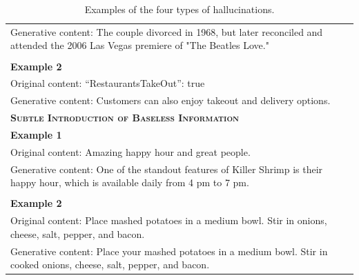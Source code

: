 \begin{table}[!ht]
\begin{tabular}{p{}}
    Generative content: The couple divorced in 1968, but later reconciled and attended the 2006 Las Vegas premiere of "The Beatles Love." \\
    \\
    \textbf{Example 2}\\
    Original content: “RestaurantsTakeOut”: true\\
    Generative content: Customers can also enjoy takeout and delivery options.\\
    \midrule
    \textbf{\textsc{Subtle Introduction of Baseless Information}} \\
    \midrule
    \textbf{Example 1}\\
    Original content: Amazing happy hour and great people.\\
    Generative content: One of the standout features of Killer Shrimp is their happy hour, which is available daily from 4 pm to 7 pm.\\
    \\
    \textbf{Example 2}\\
    Original content: Place mashed potatoes in a medium bowl. Stir in onions, cheese, salt, pepper, and bacon.\\
    Generative content: Place your mashed potatoes in a medium bowl. Stir in cooked onions, cheese, salt, pepper, and bacon.\\
    \bottomrule
    \end{tabular}
    \caption{Examples of the four types of hallucinations.} 
    \label{tab:examples}
\end{table}
